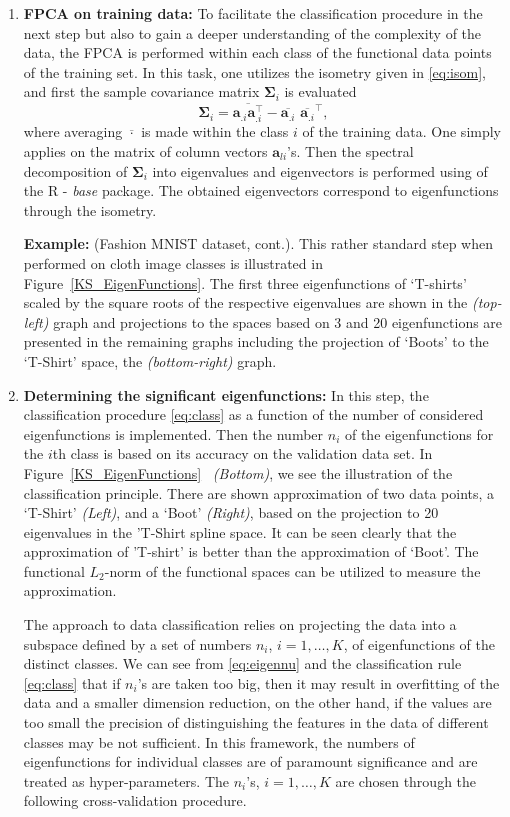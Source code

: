 \begin{enumerate}[leftmargin=0.2cm]
\item {\bf FPCA on training data:}
 To facilitate the classification procedure in the next step but also to gain a deeper understanding of the complexity of the data, the FPCA is performed within each class of the functional data points of the training set. In this task, one utilizes the isometry given in \eqref{eq:isom}, and first the sample covariance matrix $\boldsymbol \Sigma_i$ is evaluated
 $$
 \boldsymbol \Sigma_i = \overline{\mathbf a_{.i}\mathbf a_{.i}^\top} -\overline{\mathbf a_{.i}}\,\,\overline{\mathbf a_{.i}}^\top,
 $$
 where averaging $\overline{\cdot}$ is made within the class $i$ of the training data. 
One simply applies  on the matrix of column vectors $\mathbf a_{li}$'s. 
 Then the spectral decomposition of $\boldsymbol \Sigma_i$ into eigenvalues and eigenvectors is performed using  of the R -\emph{ base} package. 
 The obtained eigenvectors correspond to eigenfunctions through the isometry.
 
\noindent\textbf{Example:} (Fashion MNIST dataset, cont.).
  This rather standard step when performed on cloth image classes is illustrated in Figure~\ref{KS_EigenFunctions}. The first three eigenfunctions of `T-shirts' scaled by the square roots of the respective eigenvalues are shown in the \emph{ (top-left)} graph and projections to the spaces based on 3 and 20 eigenfunctions are presented in the remaining graphs including the projection of  `Boots' to the `T-Shirt' space, the \emph{ (bottom-right)} graph.

  \item {\bf Determining the significant eigenfunctions:}
In this step, the classification procedure \eqref{eq:class} as a function of the number of considered eigenfunctions is implemented.
Then the number $n_i$ of the eigenfunctions for the $i$th class is based on its accuracy on the validation data set.
In Figure~\ref{KS_EigenFunctions}~\emph{ (Bottom)}, we see the illustration of the classification principle. 
There are shown approximation of two data points, a `T-Shirt' \emph{ (Left)}, and a `Boot' \emph{ (Right)}, based on the projection to 20 eigenvalues in the 'T-Shirt spline space. It can be seen clearly that the approximation of 'T-shirt' is better than the approximation of `Boot'. 
The functional $L_2$-norm of the functional spaces can be utilized to measure the approximation. 

The approach to data classification relies on projecting the data into a subspace defined by a set of numbers $n_i$, $i=1,\dots, K$, of eigenfunctions of the distinct classes.
We can see from \eqref{eq:eigennu} and the classification rule \eqref{eq:class} that if $n_i$'s are taken too big, then it may result in overfitting of the data and a smaller dimension reduction, on the other hand, if the values are too small the precision of distinguishing the features in the data of different classes may be not sufficient. 
In this framework, the numbers of eigenfunctions for individual classes are of paramount significance and are treated as hyper-parameters.
The $n_i$'s, $i=1,\dots,K$ are chosen through the following cross-validation procedure. 


\end{enumerate}
